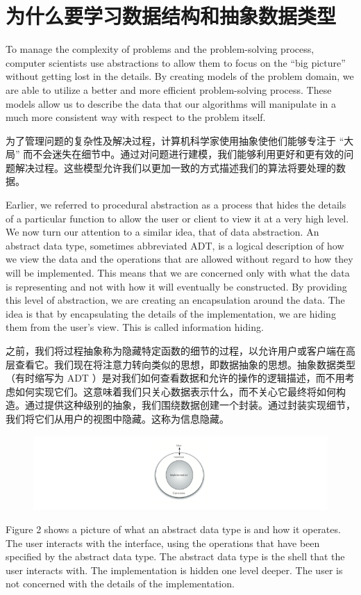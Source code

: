 \section{为什么要学习数据结构和抽象数据类型}

To manage the complexity of problems and the problem-solving process, computer scientists use abstractions to allow them to focus on the “big picture” without getting lost in the details. By creating models of the problem domain, we are able to utilize a better and more efficient problem-solving process. These models allow us to describe the data that our algorithms will manipulate in a much more consistent way with respect to the problem itself.

为了管理问题的复杂性及解决过程，计算机科学家使用抽象使他们能够专注于 “大局” 而不会迷失在细节中。通过对问题进行建模，我们能够利用更好和更有效的问题解决过程。这些模型允许我们以更加一致的方式描述我们的算法将要处理的数据。

Earlier, we referred to procedural abstraction as a process that hides the details of a particular function to allow the user or client to view it at a very high level. We now turn our attention to a similar idea, that of data abstraction. An abstract data type, sometimes abbreviated ADT, is a logical description of how we view the data and the operations that are allowed without regard to how they will be implemented. This means that we are concerned only with what the data is representing and not with how it will eventually be constructed. By providing this level of abstraction, we are creating an encapsulation around the data. The idea is that by encapsulating the details of the implementation, we are hiding them from the user’s view. This is called information hiding.

之前，我们将过程抽象称为隐藏特定函数的细节的过程，以允许用户或客户端在高层查看它。我们现在将注意力转向类似的思想，即数据抽象的思想。抽象数据类型（有时缩写为 ADT ）是对我们如何查看数据和允许的操作的逻辑描述，而不用考虑如何实现它们。这意味着我们只关心数据表示什么，而不关心它最终将如何构造。通过提供这种级别的抽象，我们围绕数据创建一个封装。通过封装实现细节，我们将它们从用户的视图中隐藏。这称为信息隐藏。

\begin{figure}[htbp]
  \centering
  \includegraphics[width=6in]{images/ds_adt.png}
\end{figure}
Figure 2 shows a picture of what an abstract data type is and how it operates. The user interacts with the interface, using the operations that have been specified by the abstract data type. The abstract data type is the shell that the user interacts with. The implementation is hidden one level deeper. The user is not concerned with the details of the implementation.


